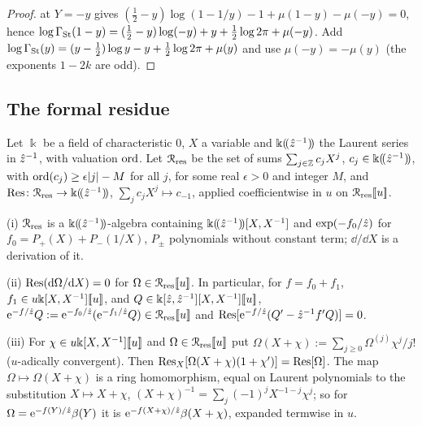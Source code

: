 \begin{proof}
 at $Y=-y$ gives $(\frac12-y)\log(1-1/y)-1+\mu(1-y)-\mu(-y)=0$, hence $\log\Gamma_{\mathrm{St}}(1-y)=(\frac12-y)\log(-y)+y+\frac12\log2\pi+\mu(-y)$. Add $\log\Gamma_{\mathrm{St}}(y)=(y-\frac12)\log y-y+\frac12\log2\pi+\mu(y)$ and use $\mu(-y)=-\mu(y)$ (the exponents $1-2k$ are odd).
\end{proof}

\subsection{The formal residue}
\label{sec:fsp-res}

\begin{lem}
\label{lem:fsp-res}
Let $\Bbbk$ be a field of characteristic $0$, $X$ a variable and $\Bbbk(\!(\hat{z}^{-1})\!)$ the Laurent series in $\hat{z}^{-1}$, with valuation $\operatorname{ord}$. Let $\mathcal{R}_{\mathrm{res}}$ be the set of sums $\sum_{j\in\mathbb{Z}}c_jX^j$, $c_j\in\Bbbk(\!(\hat{z}^{-1})\!)$, with $\operatorname{ord}(c_j)\geq\epsilon|j|-M$ for all $j$, for some real $\epsilon>0$ and integer $M$, and $\operatorname*{Res}\colon\mathcal{R}_{\mathrm{res}}\to\Bbbk(\!(\hat{z}^{-1})\!)$, $\sum_jc_jX^j\mapsto c_{-1}$, applied coefficientwise in $u$ on $\mathcal{R}_{\mathrm{res}}[\![ u ]\!]$.

(i) $\mathcal{R}_{\mathrm{res}}$ is a $\Bbbk(\!(\hat{z}^{-1})\!)$-algebra containing $\Bbbk(\!(\hat{z}^{-1})\!)[X,X^{-1}]$ and $\exp(-f_0/\hat{z})$ for $f_0=P_+(X)+P_-(1/X)$, $P_\pm$ polynomials without constant term; $\dd/\dd X$ is a derivation of it.

(ii) $\operatorname*{Res}(\mathrm{d}\Omega/\mathrm{d} X)=0$ for $\Omega\in\mathcal{R}_{\mathrm{res}}[\![ u ]\!]$. In particular, for $f=f_0+f_1$, $f_1\in u\Bbbk[X,X^{-1}][\![ u ]\!]$, and $Q\in\Bbbk[\hat{z},\hat{z}^{-1}][X,X^{-1}][\![ u ]\!]$, $\mathrm{e}^{-f/\hat{z}}Q:=\mathrm{e}^{-f_0/\hat{z}}(\mathrm{e}^{-f_1/\hat{z}}Q)\in\mathcal{R}_{\mathrm{res}}[\![ u ]\!]$ and $\operatorname*{Res}[\mathrm{e}^{-f/\hat{z}}(Q'-\hat{z}^{-1}f'Q)]=0$.

(iii) For $\chi\in u\Bbbk[X,X^{-1}][\![ u ]\!]$ and $\Omega\in\mathcal{R}_{\mathrm{res}}[\![ u ]\!]$ put $\Omega(X+\chi):=\sum_{j\geq0}\Omega^{(j)}\chi^j/j!$ ($u$-adically convergent). Then $\operatorname*{Res}_X[\Omega(X+\chi)(1+\chi')]=\operatorname*{Res}[\Omega]$. The map $\Omega\mapsto\Omega(X+\chi)$ is a ring homomorphism, equal on Laurent polynomials to the substitution $X\mapsto X+\chi$, $(X+\chi)^{-1}=\sum_j(-1)^jX^{-1-j}\chi^j$; so for $\Omega=\mathrm{e}^{-f(Y)/\hat{z}}\beta(Y)$ it is $\mathrm{e}^{-f(X+\chi)/\hat{z}}\beta(X+\chi)$, expanded termwise in $u$.
\end{lem}

